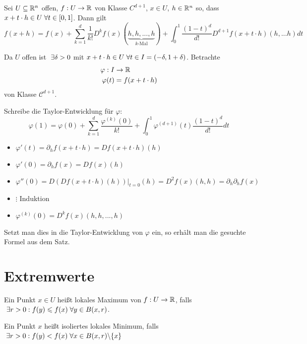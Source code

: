 \documentclass[main.tex]{subfiles}
\begin{document}
\begin{Theorem}
  Sei $U \subseteq \mathbb{R}^n$ offen, $f: U \to \mathbb{R}$ von Klasse $C^{d+1}$, $x \in U$, $h \in \mathbb{R}^n$ so, dass $x+t\cdot h \in U \;\forall t \in [0,1]$.
  Dann gilt
  $$f(x+h) = f(x) + \sum \limits_{k=1}^d \dfrac{1}{k!} D^k f(x)(\underbrace{h,h,...,h}_{k\text{-Mal}}) + \int_0^1 \dfrac{(1-t)^d}{d!} D^{d+1}f(x + t\cdot h)(h,...h) dt$$
\end{Theorem}

\begin{Beweis}
  Da $U$ offen ist $\;\exists \delta > 0$ mit $x + t \cdot h \in U \;\forall t \in I = (-\delta,1 + \delta)$. Betrachte
  $$\begin{aligned}
    \varphi: I & \to \mathbb{R} \\
    \varphi(t) & = f(x + t \cdot h)
  \end{aligned}$$
  von Klasse $\mathcal{C}^{d+1}$.

  Schreibe die Taylor-Entwicklung für $\varphi$:
  $$\varphi(1) = \varphi(0) + \sum \limits_{k=1}^d \dfrac{\varphi^{(k)}(0)}{k!} + \int_0^1 \varphi^{(d+1)}(t) \dfrac{(1-t)^d}{d!} dt$$
  \begin{itemize}
    \item $\varphi'(t) = \partial_h f(x + t \cdot h) = Df(x+ t \cdot h)(h)$
    \item $\varphi'(0) = \partial_h f(x) = Df(x)(h)$
    \item $\varphi''(0) = D(Df(x+ t \cdot h)(h))|_{t=0}(h) = D^2f(x)(h,h) = \partial_h \partial_h f(x)$
    \item $\vdots$ Induktion
    \item $\varphi^{(k)} (0) = D^k f(x)(h,h,...,h)$
  \end{itemize}
  Setzt man dies in die Taylor-Entwicklung von $\varphi$ ein, so erhält man die gesuchte Formel aus dem Satz.
\end{Beweis}


\section{Extremwerte}

\begin{Bemerkung}[Erinnerung]
  Ein Punkt $x \in U$ heißt lokales Maximum von $f:U\to \mathbb{R}$, falls $\;\exists r > 0 : f(y) \leqslant f(x) \;\forall y \in B(x,r)$.

  Ein Punkt $x$ heißt isoliertes lokales Minimum, falls $\;\exists r > 0 : f(y) < f(x) \;\forall x \in B(x,r) \backslash \{x\}$
\end{Bemerkung}
\end{document}
